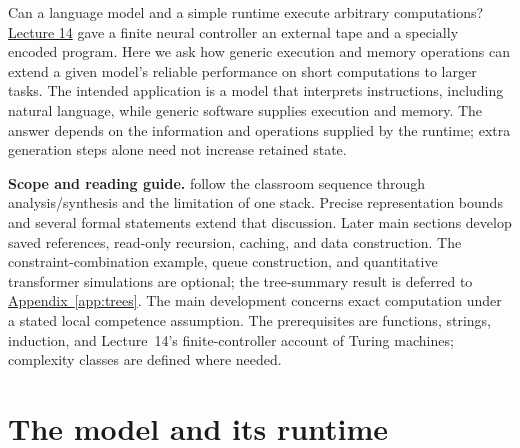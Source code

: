 \documentclass[11pt,twoside]{article}
\newcommand{\appendixref}[1]{\hyperref[#1]{Appendix~\ref*{#1}}}
\theoremstyle{definition}
\theoremstyle{remark}
\begin{document}
\begin{center}
\end{center}

Can a language model and a simple runtime execute arbitrary computations?
\href{lecture14.pdf}{Lecture 14} gave a finite neural controller an external
tape and a specially encoded program. Here we ask how generic execution and
memory operations can extend a given model's reliable performance on short
computations to larger tasks. The intended application is a model that
interprets instructions, including natural language, while generic software
supplies execution and memory. The answer depends on the information and
operations supplied by the runtime; extra generation steps alone need not
increase retained state.

\noindent\textbf{Scope and reading guide.}
 follow the classroom sequence through
analysis/synthesis and the limitation of one stack. Precise representation
bounds and several formal statements extend that discussion. Later main
sections develop saved references, read-only recursion, caching, and data
construction. The constraint-combination example, queue construction, and
quantitative transformer simulations are optional; the tree-summary result
is deferred to \appendixref{app:trees}.
The main development concerns exact computation under a stated local
competence assumption. The prerequisites are functions, strings, induction,
and Lecture~14's finite-controller account of Turing machines; complexity
classes are defined where needed.

\section{The model and its runtime}
\label{sec:interfaces}
\end{document}
